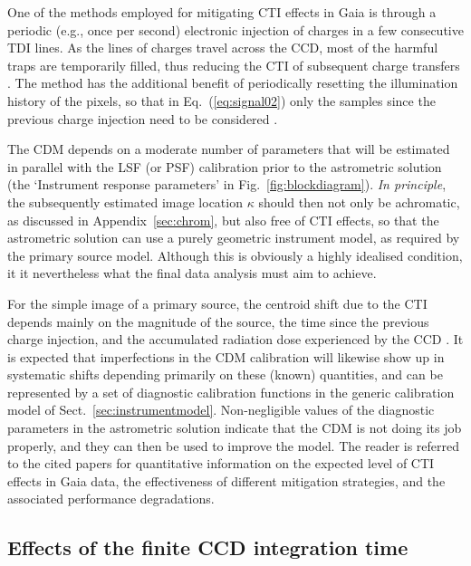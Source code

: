 \documentclass[structabstract]{aa}
\begin{document}
One of the methods employed for mitigating CTI effects in Gaia 
is through a periodic (e.g., once per second) electronic injection of charges 
in a few consecutive TDI lines. As the lines of charges travel across the CCD, 
most of the harmful traps are temporarily filled, thus reducing the CTI of
subsequent charge transfers \citep{2007SPIE.6690E...8L}.
The method has the additional benefit of periodically resetting the illumination 
history of the pixels, so that in Eq.~(\ref{eq:signal02}) only the samples since the 
previous charge injection need to be considered \citep{short2010}.

The CDM depends on a moderate number of parameters that will be
estimated in parallel with the LSF (or PSF) calibration prior to the astrometric 
solution (the `Instrument response parameters' in Fig.~\ref{fig:blockdiagram}).
\emph{In principle}, the subsequently estimated image location $\kappa$ should 
then not only be achromatic, as discussed in Appendix~\ref{sec:chrom}, but also free 
of CTI effects, so that the astrometric solution can use a purely geometric 
instrument model, as required by the primary source model. Although this is 
obviously a highly idealised condition, it it nevertheless what the final data 
analysis must aim to achieve.

For the simple image of a primary source, the
centroid shift due to the CTI depends mainly on the magnitude of the source,
the time since the previous charge injection, and the accumulated radiation
dose experienced by the CCD \citep{2011MNRAS.414.2215P}. It is expected 
that imperfections in the CDM calibration will likewise show up in systematic 
shifts depending primarily on these (known) quantities, and can be represented 
by a set of diagnostic calibration functions in the generic calibration model of 
Sect.~\ref{sec:instrumentmodel}. Non-negligible values of the diagnostic
parameters in the astrometric solution indicate that the CDM is not doing 
its job properly, and they can then be used to improve the model.
The reader is referred to the cited papers for quantitative information on 
the expected level of CTI effects in Gaia data, the effectiveness of different 
mitigation strategies, and the associated performance degradations.


\subsection{Effects of the finite CCD integration time} \label{sec:TDI}
\end{document}
